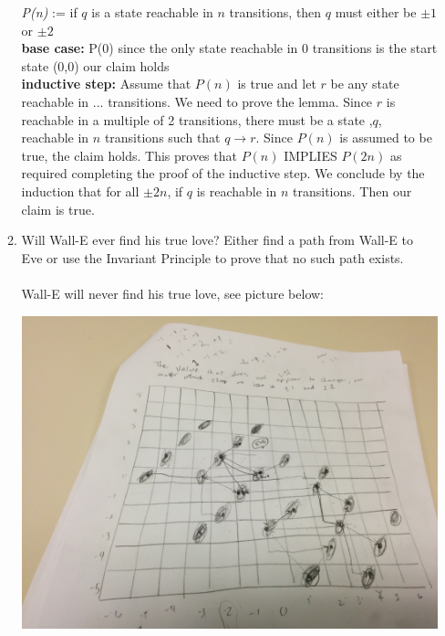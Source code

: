 \documentclass[12pt]{article}
\begin{document}
\begin{enumerate}
\begin{enumerate}
    \textit{P(n) } := if $q$ is a state reachable in $n$ transitions, then $q$ must either be $\pm 1$ or $\pm 2$ \\
    \textbf{base case:} P(0) since the only state reachable in 0 transitions is the start state (0,0) our claim holds\\
    \textbf{inductive step: } Assume that $P(n)$ is true and let $r$ be any state reachable in ... transitions. We need to prove the lemma.
    Since $r$ is reachable in a multiple of 2 transitions, there must be a state ,$q$, reachable in $n$ transitions such that $q \to r$. Since $P(n)$ is assumed to be true, the claim holds. This proves that $P(n)$ IMPLIES $P(2n)$ as required completing the proof of the inductive step. We conclude by the induction that for all $\pm 2n$, if $q$ is reachable in $n$ transitions. Then our claim is true.
\item Will Wall-E ever find his true love? Either find a path from Wall-E to Eve or use the Invariant Principle to prove that no such path exists. \\\\
    Wall-E will never find his true love, see picture below:
    \begin{center}
    \includegraphics[scale=0.10]{walle.jpg}
    \end{center}
\end{enumerate}
\end{enumerate}
\end{document}
